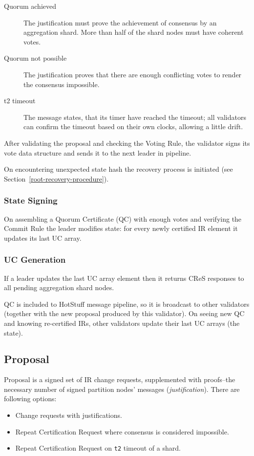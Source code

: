 \begin{description}
  \item [Quorum achieved] The justification must prove the achievement of consensus by an aggregation shard. More than half of the shard nodes must have coherent votes.
  \item [Quorum not possible] The justification proves that there are enough conflicting votes to render the consensus impossible.
  \item [t2 timeout] The message states, that its timer have reached the timeout; all validators can confirm the timeout based on their own clocks, allowing a little drift.
\end{description}

After validating the proposal and checking the Voting Rule, the validator signs its vote data structure and sends it to the next leader in pipeline.

On encountering unexpected state hash the recovery process is initiated (see Section~\ref{root-recovery-procedure}).

\subsubsection{State Signing}

On assembling a Quorum Certificate (QC) with enough votes and verifying the Commit Rule the leader modifies state: for every newly certified IR element it updates its last UC array.

\subsubsection{UC Generation}

If a leader updates the last UC array element then it returns CReS responses to all pending aggregation shard nodes.

QC is included to HotStuff message pipeline, so it is broadcast to other validators (together with the new proposal produced by this validator). On seeing new QC and knowing re-certified IRs, other validators update their last UC arrays (the state).


\subsection{Proposal}

Proposal is a signed set of IR change requests, supplemented with proofs--the necessary number of signed partition nodes' messages (\textit{justification}). There are following options:
\begin{itemize}
  \item Change requests with justifications.
  \item Repeat Certification Request where consensus is considered impossible.
  \item Repeat Certification Request on \texttt{t2} timeout of a shard.
\end{itemize}


